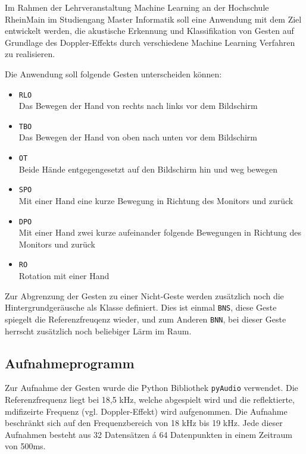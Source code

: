 Im Rahmen der Lehrveranstaltung Machine Learning an der Hochschule RheinMain im Studiengang Master Informatik soll eine Anwendung mit dem Ziel entwickelt werden, die akustische Erkennung und Klassifikation von Gesten auf Grundlage des Doppler-Effekts durch verschiedene Machine Learning Verfahren zu realisieren. 

Die Anwendung soll folgende Gesten unterscheiden können:
\begin{itemize}
	\item \texttt{\ac{RLO}}\\
	Das Bewegen der Hand von rechts nach links vor dem Bildschirm
	\item \texttt{\ac{TBO}}\\
	Das Bewegen der Hand von oben nach unten vor dem Bildschirm
	\item \texttt{\ac{OT}}\\
	Beide Hände entgegengesetzt auf den Bildschirm hin und weg bewegen
	\item \texttt{\ac{SPO}}\\
	Mit einer Hand eine kurze Bewegung in Richtung des Monitors und zurück
	\item \texttt{\ac{DPO}}\\
	Mit einer Hand zwei kurze aufeinander folgende Bewegungen in Richtung des Monitors und zurück
	\item \texttt{\ac{RO}}\\
	Rotation mit einer Hand
\end{itemize}

Zur Abgrenzung der Gesten zu einer Nicht-Geste werden zusätzlich noch die Hintergrundgeräusche als Klasse definiert. Dies ist einmal \texttt{\ac{BNS}}, diese Geste spiegelt die Referenzfreuqenz wieder, und zum Anderen \texttt{\ac{BNN}}, bei dieser Geste herrscht zusätzlich noch beliebiger Lärm im Raum. 

\subsection{Aufnahmeprogramm}
\label{sec:gestures_dataformat}

Zur Aufnahme der Gesten wurde die Python Bibliothek \texttt{pyAudio} verwendet.
Die Referenzfrequenz liegt bei 18,5 kHz, welche abgespielt wird und die
reflektierte, mdifizeirte Frequenz (vgl.
Doppler-Effekt) wird aufgenommen. Die Aufnahme beschränkt sich auf den
Frequenzbereich von 18 kHz bis 19 kHz. Jede dieser Aufnahmen besteht aus
32 Datensätzen á 64 Datenpunkten in einem Zeitraum von 500ms. 

